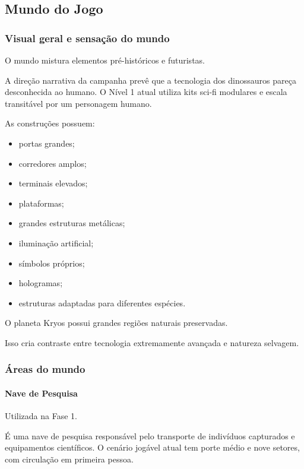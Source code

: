 \documentclass[12pt,a4paper]{article}
\begin{document}

\subsection{Mundo do Jogo}

\subsubsection{Visual geral e sensação do mundo}

O mundo mistura elementos pré-históricos e futuristas.

A direção narrativa da campanha prevê que a tecnologia dos dinossauros
pareça desconhecida ao humano. O Nível 1 atual utiliza kits sci-fi
modulares e escala transitável por um personagem humano.

As construções possuem:

\begin{itemize}
    \item portas grandes;
    \item corredores amplos;
    \item terminais elevados;
    \item plataformas;
    \item grandes estruturas metálicas;
    \item iluminação artificial;
    \item símbolos próprios;
    \item hologramas;
    \item estruturas adaptadas para diferentes espécies.
\end{itemize}

O planeta Kryos possui grandes regiões naturais preservadas.

Isso cria contraste entre tecnologia extremamente avançada e natureza
selvagem.

\subsubsection{Áreas do mundo}

\paragraph{Nave de Pesquisa}

Utilizada na Fase 1.

É uma nave de pesquisa responsável pelo transporte de indivíduos
capturados e equipamentos científicos. O cenário jogável atual tem
porte médio e nove setores, com circulação em primeira pessoa.
\end{document}
